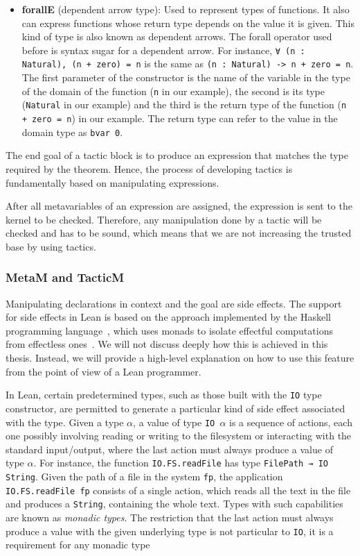 \begin{itemize}
  \item \textbf{forallE} (dependent arrow type): Used to represent types of functions. It also can express functions whose return type depends on the value it is given. This kind of type is also known as dependent arrows. The forall operator used before is syntax sugar for a dependent arrow. For instance, \texttt{∀ (n : Natural), (n + zero) = n} is the same as \texttt{(n : Natural) -> n + zero = n}. The first parameter of the constructor is the name of the variable in the type of the domain of the function (\texttt{n} in our example), the second is its type (\texttt{Natural} in our example) and the third is the return type of the function (\texttt{n + zero = n}) in our example. The return type can refer to the value in the domain type as \texttt{bvar 0}.
\end{itemize}

The end goal of a tactic block is to produce an expression that matches the type required by the theorem. Hence, the process of developing tactics is fundamentally based on manipulating expressions.

After all metavariables of an expression are assigned, the expression is sent to the kernel to be checked. Therefore, any manipulation done by a tactic will be checked and has to be sound, which means that we are not increasing the trusted base by using tactics.

\subsubsection{MetaM and TacticM}

Manipulating declarations in context and the goal are side effects. The support for side effects in Lean is based on the approach implemented by the Haskell programming language~\cite{haskell}, which uses monads to isolate effectful computations from effectless ones~\cite{imperativeFunctional}. We will not discuss deeply how this is achieved in this thesis. Instead, we will provide a high-level explanation on how to use this feature from the point of view of a Lean programmer.

In Lean, certain predetermined types, such as those built with the \texttt{IO} type constructor, are permitted to generate a particular kind of side effect associated with the type.
Given a type \texttt{$\alpha$}, a value of type \texttt{IO $\alpha$} is a sequence of actions, each one possibly involving reading or writing to the
filesystem or interacting with the standard input/output, where the last action must always produce a value of type \texttt{$\alpha$}. For instance,
the function \texttt{IO.FS.readFile} has type \texttt{FilePath → IO String}. Given the path of a file in the system \texttt{fp}, the application \texttt{IO.FS.readFile fp} consists of a single action, which reads all the text in the file and produces a \texttt{String}, containing the whole text. Types with such capabilities are known as \textit{monadic types}. The restriction that the last action must always produce a value with the given underlying type is not particular to \texttt{IO}, it is a requirement for any monadic type

